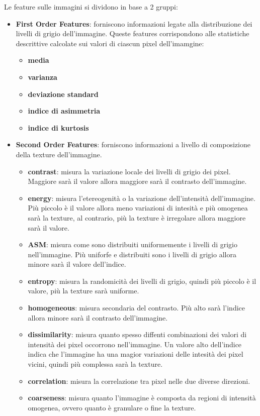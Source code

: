Le feature sulle immagini si dividono in base a 2 gruppi\cite{explanation-features}:
\begin{itemize}
    \item \textbf{First Order Features}: forniscono informazioni legate alla
    distribuzione dei livelli di grigio dell'immagine. Queste features corrispondono
    alle statistiche descrittive calcolate sui valori di ciascun pixel dell'imamgine:
    \begin{itemize}
        \item \textbf{media}
        \item \textbf{varianza}
        \item \textbf{deviazione standard}
        \item \textbf{indice di asimmetria}
        \item \textbf{indice di kurtosis}
    \end{itemize}
    \item \textbf{Second Order Features}: forniscono informazioni a livello di 
    composizione della texture dell'immagine. 
    \begin{itemize}
        \item \textbf{contrast}: misura la variazione locale dei livelli di grigio 
        dei pixel. Maggiore sarà il valore allora maggiore sarà il contrasto dell'immagine.
        \item \textbf{energy}: misura l'etereogenità o la variazione dell'intensità
        dell'immagine. Più piccolo è il valore allora meno variazioni di intesità e
        più omogenea sarà la texture, al contrario, più la texture è irregolare 
        allora maggiore sarà il valore.
        \item \textbf{ASM}: misura come sono distribuiti uniformemente i livelli
        di grigio nell'immagine. Più uniforfe e distribuiti sono i livelli di grigio
        allora minore sarà il valore dell'indice.
        \item \textbf{entropy}: misura la randomicità dei livelli di grigio, quindi
        più piccolo è il valore, più la texture sarà uniforme.
        \item \textbf{homogeneous}: misura secondaria del contrasto. Più alto sarà
        l'indice allora minore sarà il contrasto dell'immagine.
        \item \textbf{dissimilarity}: misura quanto spesso diffenti combinazioni dei valori
        di intensità dei pixel occorrono nell'immagine. Un valore alto dell'indice 
        indica che l'immagine ha una magior variazioni delle intesità dei pixel vicini,
        quindi più complessa sarà la texture.
        \item \textbf{correlation}: misura la correlazione tra pixel nelle due diverse
        direzioni.
        \item \textbf{coarseness}: misura quanto l'immagine è composta da regioni 
        di intensità omogenea, ovvero quanto è granulare o fine la texture.
    \end{itemize}
\end{itemize}



